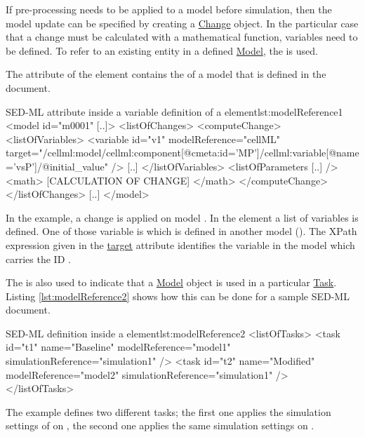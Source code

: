 If pre-processing needs to be applied to a model before simulation, then the model update can be specified by creating a \hyperref[class:change]{Change} object. In the particular case that a change must be calculated with a mathematical function, variables need to be defined. To refer to an existing entity in a defined \hyperref[class:model]{Model}, the  is used. 

The  attribute of the  element contains the  of a model that is defined in the document. 

\begin{myXmlLst}{SED-ML  attribute inside a variable definition of a   element}{lst:modelReference1}
<model id="m0001" [..]>
 <listOfChanges>
   <computeChange>
    <listOfVariables>
     <variable id="v1" modelReference="cellML" target="/cellml:model/cellml:component[@cmeta:id='MP']/cellml:variable[@name='vsP']/@initial_value" />
     [..]
    </listOfVariables>
    <listOfParameters [..] />
    <math>
     [CALCULATION OF CHANGE]
    </math>
   </computeChange>
 </listOfChanges>
 [..]
</model>
\end{myXmlLst}

In the example, a change is  applied on model . In the  element a list of variables is defined. One of those variable is  which is defined in another model (). The XPath expression given in the \hyperref[sec:target]{target} attribute identifies the variable in the model which carries the ID .

The  is also used to indicate that a \hyperref[class:model]{Model} object is used in a particular  \hyperref[class:task]{Task}. Listing \ref{lst:modelReference2} shows how this can be done for a sample SED-ML document.

\begin{myXmlLst}{SED-ML  definition inside a  element}{lst:modelReference2}
<listOfTasks>
 <task id="t1" name="Baseline" modelReference="model1" simulationReference="simulation1" />
 <task id="t2" name="Modified" modelReference="model2" simulationReference="simulation1" />
</listOfTasks>
\end{myXmlLst}

The example defines two different tasks; the first one applies the simulation settings of  on , the second one applies the same simulation settings on .


